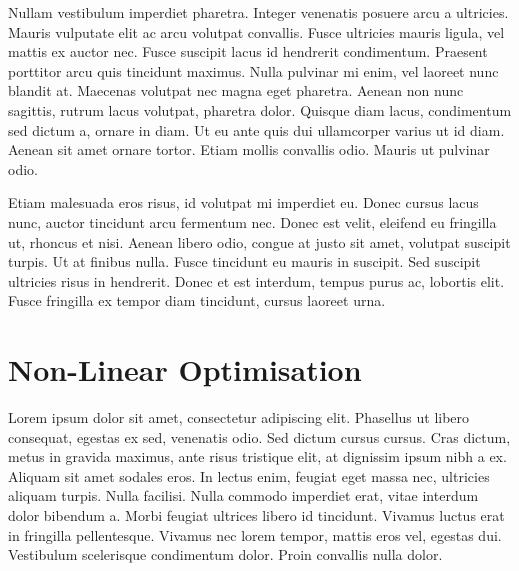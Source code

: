 Nullam vestibulum imperdiet pharetra. Integer venenatis posuere arcu a ultricies. Mauris vulputate elit ac arcu volutpat convallis. Fusce ultricies mauris ligula, vel mattis ex auctor nec. Fusce suscipit lacus id hendrerit condimentum. Praesent porttitor arcu quis tincidunt maximus. Nulla pulvinar mi enim, vel laoreet nunc blandit at. Maecenas volutpat nec magna eget pharetra. Aenean non nunc sagittis, rutrum lacus volutpat, pharetra dolor. Quisque diam lacus, condimentum sed dictum a, ornare in diam. Ut eu ante quis dui ullamcorper varius ut id diam. Aenean sit amet ornare tortor. Etiam mollis convallis odio. Mauris ut pulvinar odio.

Etiam malesuada eros risus, id volutpat mi imperdiet eu. Donec cursus lacus nunc, auctor tincidunt arcu fermentum nec. Donec est velit, eleifend eu fringilla ut, rhoncus et nisi. Aenean libero odio, congue at justo sit amet, volutpat suscipit turpis. Ut at finibus nulla. Fusce tincidunt eu mauris in suscipit. Sed suscipit ultricies risus in hendrerit. Donec et est interdum, tempus purus ac, lobortis elit. Fusce fringilla ex tempor diam tincidunt, cursus laoreet urna.

\section{Non-Linear Optimisation}

\cite{2016arXiv160502688short}
\cite{vanAarle201535}
\cite{Palenstijn2011250}
\cite{Schoonjans2011776}
\cite{van2008visualizing}
\cite{kheruka2011study}
\cite{herman1983comparative}
\cite{alvarez1976energy}
\cite{berge2007xcom}
\cite{shewchuk1994introduction}
\cite{rezvani2012iterative}
\cite{ranganathan2004levenberg}
\cite{fletcher1971modified}
\cite{hager2006survey}
\cite{zhang2014statistical}
\cite{burger2014total}
\cite{graps1995introduction}
\cite{sodickson2015rapid}
\cite{semerci2014tensor}
\cite{gao2011multi}
\cite{poludniowski2009spekcalc}
\cite{Duchi}
\cite{barberoTV14}

Lorem ipsum dolor sit amet, consectetur adipiscing elit. Phasellus ut libero consequat, egestas ex sed, venenatis odio. Sed dictum cursus cursus. Cras dictum, metus in gravida maximus, ante risus tristique elit, at dignissim ipsum nibh a ex. Aliquam sit amet sodales eros. In lectus enim, feugiat eget massa nec, ultricies aliquam turpis. Nulla facilisi. Nulla commodo imperdiet erat, vitae interdum dolor bibendum a. Morbi feugiat ultrices libero id tincidunt. Vivamus luctus erat in fringilla pellentesque. Vivamus nec lorem tempor, mattis eros vel, egestas dui. Vestibulum scelerisque condimentum dolor. Proin convallis nulla dolor.

